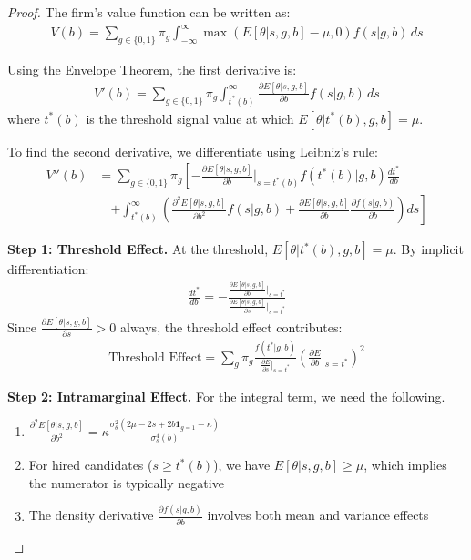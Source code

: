 \begin{proof}
The firm's value function can be written as:
\begin{align}
V(b) = \sum_{g \in \{0,1\}} \pi_g \int_{-\infty}^\infty \max(E[\theta|s,g,b] - \mu, 0) f(s|g,b) \, ds
\end{align}

Using the Envelope Theorem, the first derivative is:
\begin{align}
V'(b) = \sum_{g \in \{0,1\}} \pi_g \int_{t^*(b)}^\infty \frac{\partial E[\theta|s,g,b]}{\partial b} f(s|g,b) \, ds
\end{align}
where $t^*(b)$ is the threshold signal value at which $E[\theta|t^*(b),g,b] = \mu$.

To find the second derivative, we differentiate using Leibniz's rule:
\begin{align}
V''(b) &= \sum_{g \in \{0,1\}} \pi_g \left[ -\frac{\partial E[\theta|s,g,b]}{\partial b}\bigg|_{s=t^*(b)} f(t^*(b)|g,b) \frac{dt^*}{db} \right. \\
&\quad \left. + \int_{t^*(b)}^\infty \left( \frac{\partial^2 E[\theta|s,g,b]}{\partial b^2} f(s|g,b) + \frac{\partial E[\theta|s,g,b]}{\partial b} \frac{\partial f(s|g,b)}{\partial b} \right) ds \right]
\end{align}

\textbf{Step 1: Threshold Effect.} At the threshold, $E[\theta|t^*(b),g,b] = \mu$. By implicit differentiation:
\begin{align}
\frac{dt^*}{db} = -\frac{\frac{\partial E[\theta|s,g,b]}{\partial b}\big|_{s=t^*}}{\frac{\partial E[\theta|s,g,b]}{\partial s}\big|_{s=t^*}}
\end{align}
Since $\frac{\partial E[\theta|s,g,b]}{\partial s} > 0$ always, the threshold effect contributes:
\begin{align}
\text{Threshold Effect} = \sum_{g} \pi_g \frac{f(t^*|g,b)}{\frac{\partial E}{\partial s}\big|_{s=t^*}} \left(\frac{\partial E}{\partial b}\bigg|_{s=t^*}\right)^2
\end{align}

\textbf{Step 2: Intramarginal Effect.} For the integral term, we need the following.
\begin{enumerate}
    \item $\frac{\partial^2 E[\theta|s,g,b]}{\partial b^2} = \kappa \frac{\sigma_\theta^2 (2\mu - 2s + 2b\mathbf{1}_{g=1} - \kappa)}{\sigma_s^4(b)}$
    \item For hired candidates ($s \geq t^*(b)$), we have $E[\theta|s,g,b] \geq \mu$, which implies the numerator is typically negative
    \item The density derivative $\frac{\partial f(s|g,b)}{\partial b}$ involves both mean and variance effects
\end{enumerate}


\end{proof}
